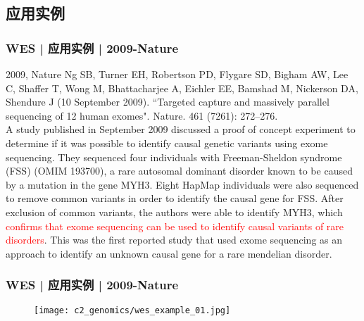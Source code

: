 \subsection{应用实例}
\begin{frame}
  \frametitle{WES | 应用实例 | 2009-Nature}
  \footnotesize{
    \begin{block}{2009, Nature}
  Ng SB, Turner EH, Robertson PD, Flygare SD, Bigham AW, Lee C, Shaffer T, Wong M, Bhattacharjee A, Eichler EE, Bamshad M, Nickerson DA, Shendure J (10 September 2009). ``Targeted capture and massively parallel sequencing of 12 human exomes". Nature. 461 (7261): 272–276.\\
  \vspace{1em}
  A study published in September 2009 discussed a proof of concept experiment to determine if it was possible to identify causal genetic variants using exome sequencing. They sequenced four individuals with Freeman-Sheldon syndrome (FSS) (OMIM 193700), a rare autosomal dominant disorder known to be caused by a mutation in the gene MYH3. Eight HapMap individuals were also sequenced to remove common variants in order to identify the causal gene for FSS. After exclusion of common variants, the authors were able to identify MYH3, which \textcolor{red}{confirms that exome sequencing can be used to identify causal variants of rare disorders}. This was the first reported study that used exome sequencing as an approach to identify an unknown causal gene for a rare mendelian disorder.
    \end{block}
}
\end{frame}

\begin{frame}
  \frametitle{WES | 应用实例 | 2009-Nature}
  \begin{figure}
    \centering
    \texttt{[image: c2\_genomics/wes\_example\_01.jpg]}
  \end{figure}
\end{frame}

